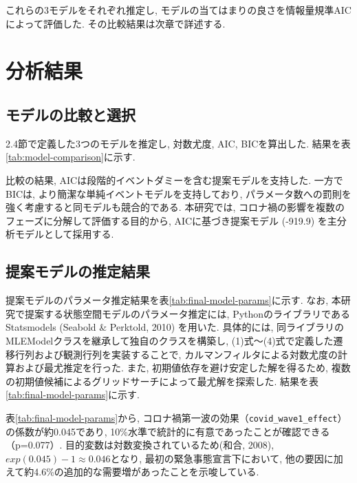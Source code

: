 \documentclass[a4paper, 10pt]{jarticle}
\begin{document}
これらの3モデルをそれぞれ推定し, モデルの当てはまりの良さを情報量規準AICによって評価した. 
その比較結果は次章で詳述する. 

\section{分析結果}
\subsection{モデルの比較と選択}
2.4節で定義した3つのモデルを推定し, 対数尤度, AIC, BICを算出した. 
結果を表\ref{tab:model-comparison}に示す. 

比較の結果, AICは段階的イベントダミーを含む提案モデルを支持した. 
一方でBICは, より簡潔な単純イベントモデルを支持しており, 
パラメータ数への罰則を強く考慮すると同モデルも競合的である. 
本研究では, コロナ禍の影響を複数のフェーズに分解して評価する目的から, 
AICに基づき提案モデル (-919.9) を主分析モデルとして採用する.
\subsection{提案モデルの推定結果}
提案モデルのパラメータ推定結果を表\ref{tab:final-model-params}に示す. 
なお, 本研究で提案する状態空間モデルのパラメータ推定には, 
PythonのライブラリであるStatsmodels (Seabold \& Perktold, 2010) を用いた. 
具体的には, 同ライブラリのMLEModelクラスを継承して独自のクラスを構築し, (1)式〜(4)式で定義した遷移行列および観測行列を実装することで, 
カルマンフィルタによる対数尤度の計算および最尤推定を行った. 
また, 初期値依存を避け安定した解を得るため, 複数の初期値候補によるグリッドサーチによって最尤解を探索した. 結果を表\ref{tab:final-model-params}に示す. 



表\ref{tab:final-model-params}から, コロナ禍第一波の効果（\texttt{covid\_wave1\_effect}）の係数が約0.045であり, 10\%水準で統計的に有意であったことが確認できる（p=0.077）. 
目的変数は対数変換されているため(和合, 2008), $exp(0.045)-1 \approx 0.046$となり, 
最初の緊急事態宣言下において, 他の要因に加えて約4.6\%の追加的な需要増があったことを示唆している. 
\end{document}
